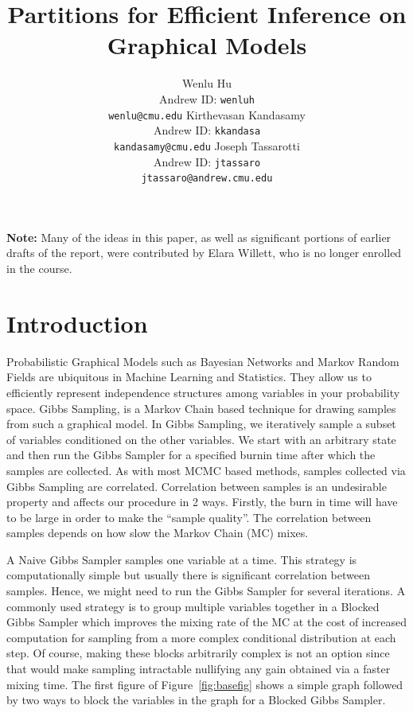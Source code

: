 \documentclass{article} %
\title{Partitions for Efficient Inference on Graphical Models}
\author{
  Wenlu Hu\\
  Andrew ID: \texttt{wenluh} \\
  \texttt{wenlu@cmu.edu}
\And
  Kirthevasan Kandasamy\\
  Andrew ID: \texttt{kkandasa}\\
  \texttt{kandasamy@cmu.edu}
\And
  Joseph Tassarotti \\
  Andrew ID: \texttt{jtassaro} \\
  \texttt{jtassaro@andrew.cmu.edu}
}
\begin{document}
\maketitle



\textbf{Note:} Many of the ideas in this paper, as well as significant portions of earlier drafts of the report, were contributed by Elara Willett, who is no longer enrolled in the course.


\section{Introduction} 

Probabilistic Graphical Models such as Bayesian Networks and Markov Random
Fields are ubiquitous in Machine Learning and Statistics. They allow us to
efficiently represent independence structures among variables in your
probability space. Gibbs Sampling, \cite{liu01mcmcscicomp} is a Markov Chain
based technique for drawing samples from such a graphical model. 
In Gibbs Sampling, we iteratively sample a subset of variables conditioned on
the other variables. We start with an arbitrary state and then run the Gibbs
Sampler for a specified burnin time after which the samples are collected.
As with most MCMC based methods, samples collected via Gibbs Sampling 
are correlated. Correlation between samples is an undesirable property
\cite{liu01mcmcscicomp} and affects our procedure in 2 ways. Firstly, the burn
in time will have to be large in order to make the ``sample quality''.
The correlation between samples depends on how slow the Markov Chain (MC) mixes.

A Naive Gibbs Sampler samples one variable at a time. This strategy is
computationally simple but usually there is significant correlation between
samples. Hence, we might need to run the Gibbs Sampler for several iterations.
A commonly used strategy is to group multiple
variables together in a Blocked Gibbs Sampler which improves the mixing rate of
the MC at the cost of increased computation for sampling from a more complex
conditional distribution at each step. Of course, making these blocks
arbitrarily complex is not an option since that would make sampling intractable
nullifying any gain obtained via a faster mixing time. The first figure of
Figure~\ref{fig:basefig} shows a simple graph followed by two ways to block the
variables in the graph for a Blocked Gibbs Sampler.
\end{document}

